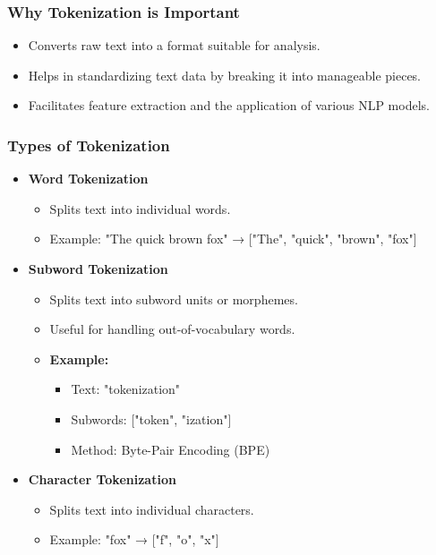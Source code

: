 \documentclass{beamer}
\begin{document}
\begin{frame}
    \frametitle{Why Tokenization is Important}
    \begin{itemize}
        \item Converts raw text into a format suitable for analysis.
        \item Helps in standardizing text data by breaking it into manageable pieces.
        \item Facilitates feature extraction and the application of various NLP models.
    \end{itemize}
\end{frame}

\begin{frame}
    \frametitle{Types of Tokenization}
    \begin{itemize}
        \item \textbf{Word Tokenization}
        \begin{itemize}
            \item Splits text into individual words.
            \item Example: "The quick brown fox" → ["The", "quick", "brown", "fox"]
        \end{itemize}
        \item \textbf{Subword Tokenization}
        \begin{itemize}
            \item Splits text into subword units or morphemes.
            \item Useful for handling out-of-vocabulary words.
            \item \textbf{Example:}
            \begin{itemize}
                \item Text: "tokenization"
                \item Subwords: ["token", "ization"]
                \item Method: Byte-Pair Encoding (BPE)
            \end{itemize}
        \end{itemize}
        \item \textbf{Character Tokenization}
        \begin{itemize}
            \item Splits text into individual characters.
            \item Example: "fox" → ["f", "o", "x"]
        \end{itemize}
    \end{itemize}
\end{frame}
\end{document}
